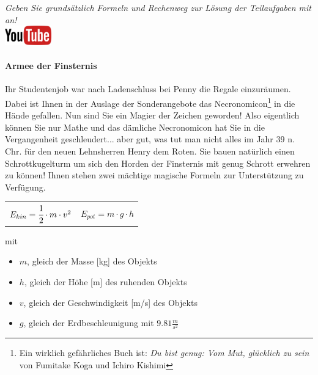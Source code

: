 \documentclass[a4paper, 9pt]{scrartcl}\usepackage[]{graphicx}\usepackage[]{xcolor}
\begin{document}
\textit{Geben Sie grunds{\"a}tzlich Formeln und Rechenweg zur L{\"o}sung der
  Teilaufgaben mit an!} \\[1Ex]

\hfill\href{https://youtu.be/Bbu6n8MXxQk}{\includegraphics[width =
  2cm]{img/youtube}} %
\hspace{2Ex}

\paragraph{Armee der Finsternis}



Ihr Studentenjob war nach Ladenschluss bei Penny die Regale
einzur{\"a}umen. Dabei ist Ihnen in der Auslage der Sonderangebote das
Necronomicon\footnote{Ein wirklich gef{\"a}hrliches Buch ist:
  \textit{Du bist genug: Vom Mut, gl{\"u}cklich zu sein} von Fumitake Koga und
  Ichiro Kishimi} in die H{\"a}nde gefallen. Nun sind Sie ein Magier der
Zeichen geworden! Also eigentlich k{\"o}nnen Sie nur Mathe und das d{\"a}mliche
Necronomicon hat Sie in die Vergangenheit geschleudert... aber gut, was tut
man nicht alles im Jahr 39 n. Chr. f{\"u}r den neuen Lehnsherren
Henry dem Roten. Sie bauen nat{\"u}rlich einen Schrottkugelturm um sich den
Horden der Finsternis mit genug Schrott erwehren zu k{\"o}nnen! Ihnen stehen
zwei m{\"a}chtige magische Formeln zur Unterst{\"u}tzung zu Verf{\"u}gung.

\begin{center}
  \begin{tabular}{cc}
    $E_{kin} = \cfrac{1}{2}\cdot m \cdot v^2$ & $E_{pot} = m \cdot g \cdot h$\\
  \end{tabular}
\end{center}

mit

\begin{itemize}
\item $m$, gleich der Masse [kg] des Objekts
\item $h$, gleich der H{\"o}he [m] des ruhenden Objekts
\item $v$, gleich der Geschwindigkeit [m/s] des Objekts
\item $g$, gleich der Erdbeschleunigung mit $9.81 \tfrac{m}{s^2}$ 
\end{itemize}
\end{document}

